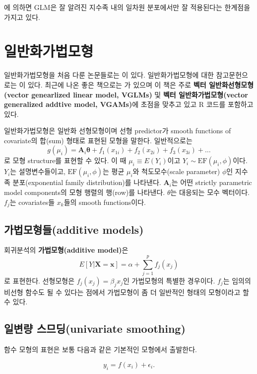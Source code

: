 \documentclass[b5paper,]{scrbook}
\theoremstyle{plain}
\theoremstyle{definition}
\numberwithin{equation}{section}
\begin{document}
\citep{Yee2015}에 의하면 GLM은 잘 알려진 지수족 내의 일차원 분포에서만
잘 적용된다는 한계점을 가지고 있다.

\chapter{일반화가법모형}\label{gam}

일반화가법모형을 처음 다룬 논문들로는 \citep{Hastie1986}이 있다.
일반화가법모형에 대한 참고문헌으로는 \citep{Wood2006}이 있다. 최근에
나온 좋은 책으로는 \citep{Yee2015}가 있으며 이 책은 주로 \textbf{벡터
일반화선형모형(vector genearlized linear model, VGLMs)} 및 \textbf{벡터
일반화가법모형(vector generalized addtive model, VGAMs)}에 초점을 맞추고
있고 R 코드를 포함하고 있다.

일반화가법모형은 일반화 선형모형이며 선형 predictor가 smooth functions
of covariate의 합(sum) 형태로 표현된 모형을 말한다. 일반적으로는
\[g(\mu_{i})=\mathbf{A}_{i}\boldsymbol{\theta}+f_{1}(x_{1i})+f_{2}(x_{2i})+f_{3}(x_{3i})+\ldots\]
로 모형 structure를 표현할 수 있다. 이 때 \(\mu_{i}\equiv E(Y_{i})\)이고
\(Y_{i}\sim \text{EF}(\mu_{i},\phi)\)이다. \(Y_{i}\)는 설명변수들이고,
\(\text{EF}(\mu_{i},\phi)\)는 평균 \(\mu_{i}\)와 척도모수(scale
parameter) \(\phi\)인 지수족 분포(exponential family distribution)를
나타낸다. \(\mathbf{A}_{i}\)는 어떤 strictly parametric model
components의 모형 행렬의 행(row)를 나타낸다. \(\theta\)는 대응되는 모수
벡터이다. \(f_{j}\)는 covariates들 \(x_{k}\)들의 smooth functions이다.

\section{가법모형들(additive models)}\label{additive-models}

회귀분석의 \textbf{가법모형(additive model)}은
\[E[Y|\mathbf{X}=\mathbf{x}]=\alpha+\sum_{j=1}^{p}f_{j}(x_j)\] 로
표현한다. 선형모형은 \(f_{j}(x_{j})=\beta_{j}x_{j}\)인 가법모형의 특별한
경우이다. \(f_{j}\)는 임의의 비선형 함수도 될 수 있다는 점에서
가법모형이 좀 더 일반적인 형태의 모형이라고 할 수 있다.

\section{일변량 스므딩(univariate
smoothing)}\label{-univariate-smoothing-1}

함수 모형의 표현은 보통 다음과 같은 기본적인 모형에서 출발한다.

\begin{equation}
y_{i}=f(x_{i})+\epsilon_{i}.
\label{eq:univariatesmoothing}
\end{equation}
\end{document}
